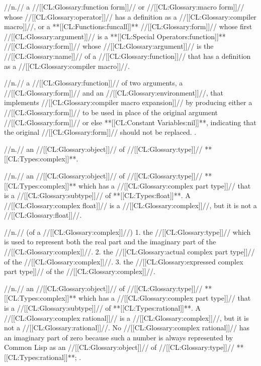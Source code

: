  //n.// a //[[CL:Glossary:function form]]// or //[[CL:Glossary:macro form]]// whose //[[CL:Glossary:operator]]// has a definition as a //[[CL:Glossary:compiler macro]]//, or a **[[CL:Functions:funcall]]** //[[CL:Glossary:form]]// whose first //[[CL:Glossary:argument]]// is a **[[CL:Special Operators:function]]** //[[CL:Glossary:form]]// whose //[[CL:Glossary:argument]]// is the //[[CL:Glossary:name]]// of a //[[CL:Glossary:function]]// that has a definition as a //[[CL:Glossary:compiler macro]]//.

 //n.// a //[[CL:Glossary:function]]// of two arguments, a //[[CL:Glossary:form]]// and an //[[CL:Glossary:environment]]//, that implements //[[CL:Glossary:compiler macro expansion]]// by producing either a //[[CL:Glossary:form]]// to be used in place of the original argument //[[CL:Glossary:form]]// or else **[[CL:Constant Variables:nil]]**, indicating that the original //[[CL:Glossary:form]]// should not be replaced. \Seesection\CompilerMacros.

 //n.// an //[[CL:Glossary:object]]// of //[[CL:Glossary:type]]// **[[CL:Types:complex]]**.

 //n.// an //[[CL:Glossary:object]]// of //[[CL:Glossary:type]]// **[[CL:Types:complex]]** which has a //[[CL:Glossary:complex part type]]// that is a //[[CL:Glossary:subtype]]// of **[[CL:Types:float]]**. A //[[CL:Glossary:complex float]]// is a //[[CL:Glossary:complex]]//, but it is not a //[[CL:Glossary:float]]//.

 //n.// (of a //[[CL:Glossary:complex]]//) 1. the //[[CL:Glossary:type]]// which is used to represent both the real part and the imaginary part of the //[[CL:Glossary:complex]]//. 2. the //[[CL:Glossary:actual complex part type]]// of the //[[CL:Glossary:complex]]//. 3. the //[[CL:Glossary:expressed complex part type]]// of the //[[CL:Glossary:complex]]//.

 //n.// an //[[CL:Glossary:object]]// of //[[CL:Glossary:type]]// **[[CL:Types:complex]]** which has a //[[CL:Glossary:complex part type]]// that is a //[[CL:Glossary:subtype]]// of **[[CL:Types:rational]]**. A //[[CL:Glossary:complex rational]]// is a //[[CL:Glossary:complex]]//, but it is not a //[[CL:Glossary:rational]]//. No //[[CL:Glossary:complex rational]]// has an imaginary part of zero because such a number is always represented by Common Lisp as an //[[CL:Glossary:object]]// of //[[CL:Glossary:type]]// **[[CL:Types:rational]]**; \seesection\RuleOfCanonRepForComplexRationals.

